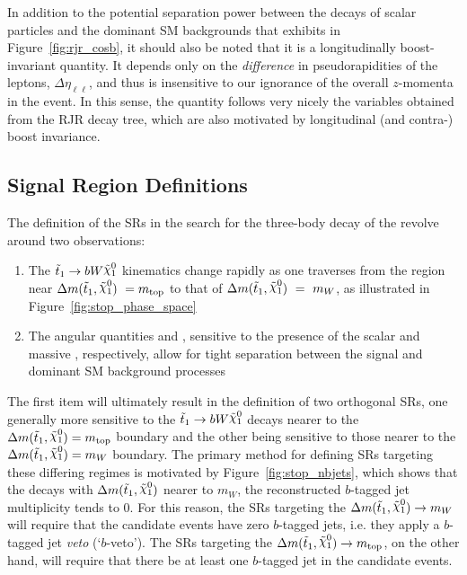 In addition to the potential separation power between the decays of scalar \stopone particles
and the dominant SM backgrounds that \cosb exhibits in Figure~\ref{fig:rjr_cosb}, it should also
be noted that it is a longitudinally boost-invariant quantity.
It depends only on the \textit{difference} in pseudorapidities of the leptons, $\Delta \eta_{\ell\ell}$,
and thus is insensitive to our ignorance of the overall $z$-momenta in the event.
In this sense, the quantity \cosb follows very nicely the variables obtained from the RJR decay tree,
which are also motivated by longitudinal (and contra-) boost invariance.

\FloatBarrier
%
%
\subsection{Signal Region Definitions}
\label{sec:stop_signal_region}

The definition of the SRs in the search for the three-body decay of the \stopone revolve around
two observations:
\begin{enumerate}
    \item The $\stopone \rightarrow b W \ninoone$ kinematics change rapidly as one traverses from
        the region near $\sdiff~ = m_{\text{top}}$ to that of $\sdiff~ = ~m_W$,
        as illustrated in Figure~\ref{fig:stop_phase_space}
    \item The angular quantities \cosb and \dpb,  sensitive to the presence of the scalar \stopone and massive
        \ninoone, respectively, allow for tight separation between the \stopone signal and dominant
        SM background processes
\end{enumerate}
The first item will ultimately result in the definition of two orthogonal SRs, one generally
more sensitive to the $\bWN$ decays nearer to the $\sdiff = m_{\text{top}}$ boundary
and the other being sensitive to those nearer to the $\sdiff = m_W$ boundary.
The primary method for defining SRs targeting these differing regimes is motivated by Figure~\ref{fig:stop_nbjets},
which shows that the \bWN decays with $\sdiff$ nearer to $m_W$, the reconstructed $b$-tagged
jet multiplicity tends to 0.
For this reason, the SRs targeting the $\sdiff \rightarrow m_W$ will require that the
candidate events have zero $b$-tagged jets, i.e. they apply a $b$-tagged jet \textit{veto} (`$b$-veto').
The SRs targeting the $\sdiff \rightarrow m_{\text{top}}$, on the other hand, will
require that there be at least one $b$-tagged jet in the candidate events.

